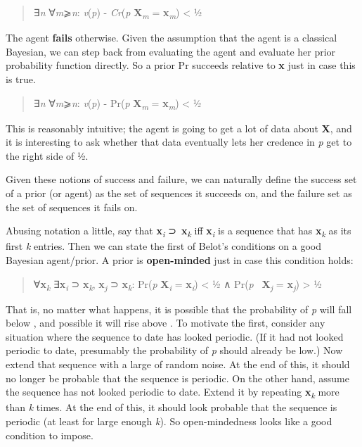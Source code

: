 \documentclass[
  10pt,
  letterpaper,
  DIV=11,
  numbers=noendperiod,
  twoside]{scrartcl}
\begin{document}
\begin{quote}
∃\emph{n} ∀\emph{m}⩾\emph{n}: \textbar{}\emph{v}(\emph{p}) -
\emph{Cr}(\emph{p} \textbar{} \textbf{X}\textsubscript{\emph{m}} =
\textbf{x}\textsubscript{\emph{m}})\textbar{} \textless{} ½
\end{quote}

The agent \textbf{fails} otherwise. Given the assumption that the agent
is a classical Bayesian, we can step back from evaluating the agent and
evaluate her prior probability function directly. So a prior Pr succeeds
relative to \textbf{x} just in case this is true.

\begin{quote}
∃\emph{n} ∀\emph{m}⩾\emph{n}: \textbar{}\emph{v}(\emph{p}) - Pr(\emph{p}
\textbar{} \textbf{X}\textsubscript{\emph{m}} =
\textbf{x}\textsubscript{\emph{m}})\textbar{} \textless{} ½
\end{quote}

This is reasonably intuitive; the agent is going to get a lot of data
about \textbf{X}, and it is interesting to ask whether that data
eventually lets her credence in \emph{p} get to the right side of ½.

Given these notions of success and failure, we can naturally define the
success set of a prior (or agent) as the set of sequences it succeeds
on, and the failure set as the set of sequences it fails on.

Abusing notation a little, say that \textbf{x}\textsubscript{\emph{i}}
⊃~\textbf{x}\textsubscript{\emph{k}} iff
\textbf{x}\textsubscript{\emph{i}} is a sequence that has
\textbf{x}\textsubscript{\emph{k}} as its first \emph{k} entries. Then
we can state the first of Belot's conditions on a good Bayesian
agent/prior. A prior is \textbf{open-minded} just in case this condition
holds:

\begin{quote}
∀\textbf{x}\textsubscript{\emph{k}} ∃\textbf{x}\textsubscript{\emph{i}}
⊃ \textbf{x}\textsubscript{\emph{k}}, \textbf{x}\textsubscript{\emph{j}}
⊃ \textbf{x}\textsubscript{\emph{k}}: Pr(\emph{p} \textbar{}
\textbf{X}\textsubscript{\emph{i}} = \textbf{x}\textsubscript{\emph{i}})
\textless{} ½ ∧ Pr(\emph{p}~\textbar{}
\textbf{X}\textsubscript{\emph{j}} = \textbf{x}\textsubscript{\emph{j}})
\textgreater{} ½
\end{quote}

That is, no matter what happens, it is possible that the probability of
\emph{p} will fall below , and possible it will rise above . To motivate
the first, consider any situation where the sequence to date has looked
periodic. (If it had not looked periodic to date, presumably the
probability of \emph{p} should already be low.) Now extend that sequence
with a large of random noise. At the end of this, it should no longer be
probable that the sequence is periodic. On the other hand, assume the
sequence has not looked periodic to date. Extend it by repeating
\textbf{x}\textsubscript{\emph{k}} more than \emph{k} times. At the end
of this, it should look probable that the sequence is periodic (at least
for large enough \emph{k}). So open-mindedness looks like a good
condition to impose.
\end{document}
